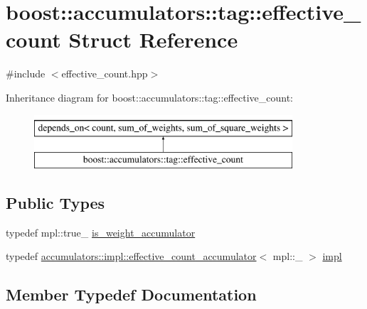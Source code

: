 \hypertarget{structboost_1_1accumulators_1_1tag_1_1effective__count}{}\section{boost\+:\+:accumulators\+:\+:tag\+:\+:effective\+\_\+count Struct Reference}
\label{structboost_1_1accumulators_1_1tag_1_1effective__count}


{\ttfamily \#include $<$effective\+\_\+count.\+hpp$>$}

Inheritance diagram for boost\+:\+:accumulators\+:\+:tag\+:\+:effective\+\_\+count\+:\begin{figure}[H]
\begin{center}
\leavevmode
\includegraphics[height=2.000000cm]{structboost_1_1accumulators_1_1tag_1_1effective__count}
\end{center}
\end{figure}
\subsection*{Public Types}
\begin{DoxyCompactItemize}
\item 
typedef mpl\+::true\+\_\+ \hyperlink{structboost_1_1accumulators_1_1tag_1_1effective__count_ac4274fac6b1cf2217291494cd34d67d2}{is\+\_\+weight\+\_\+accumulator}
\item 
typedef \hyperlink{structboost_1_1accumulators_1_1impl_1_1effective__count__accumulator}{accumulators\+::impl\+::effective\+\_\+count\+\_\+accumulator}$<$ mpl\+::\+\_ $>$ \hyperlink{structboost_1_1accumulators_1_1tag_1_1effective__count_afb8cd525da641f5b3f81759f2c614350}{impl}
\end{DoxyCompactItemize}


\subsection{Member Typedef Documentation}
\hypertarget{structboost_1_1accumulators_1_1tag_1_1effective__count_afb8cd525da641f5b3f81759f2c614350}{}
